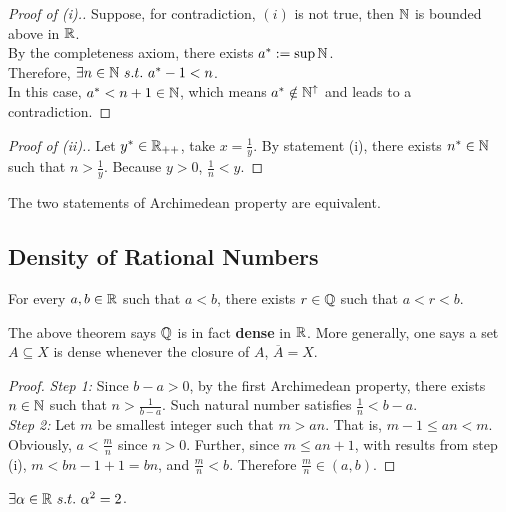 \documentclass[11pt]{article}
\begin{document}
	\begin{proof}[Proof of (i).]
		Suppose, for contradiction, $(i)$ is not true, then $\mathbb{N}$ is bounded above in $\mathbb{R}$. \\
		By the completeness axiom, there exists $a^* := \sup \mathbb{N}$.\\
		Therefore, $\exists n \in \mathbb{N}\ s.t.\ a^* - 1< n$.\\
		In this case, $a^* < n + 1 \in \mathbb{N}$, which means $a^* \notin \mathbb{N}^\uparrow$ and leads to a contradiction.
	\end{proof}
	
	\begin{proof}[Proof of (ii).]
		Let $y^* \in \mathbb{R}_{++}$, take $x = \frac{1}{y}$. By statement (i), there exists $n^* \in \mathbb{N}$ such that $n >	\frac{1}{y}$. Because $y > 0$, $\frac{1}{n} < y$.
	\end{proof}
	
	\begin{remark}
		The two statements of Archimedean property are equivalent.
	\end{remark}
	
	\subsection{Density of Rational Numbers}
	\begin{theorem}
		For every $a, b \in \mathbb{R}$ such that $a < b$, there exists $r \in \mathbb{Q}$ such that $a < r < b$.
	\end{theorem}
	
	\begin{remark}
		The above theorem says $\mathbb{Q}$ is in fact \textbf{dense} in $\mathbb{R}$. More generally, one says a set $A \subseteq X$ is dense whenever the closure of $A$, $\overline{A} = X$.
	\end{remark}
	
	\begin{proof}
		\emph{Step 1:} Since $b - a > 0$, by the first Archimedean property, there exists $n \in \mathbb{N}$ such that $n > \frac{1}{b - a}$. Such natural number satisfies $\frac{1}{n} < b - a$.\\
		\emph{Step 2:} Let $m$ be smallest integer such that $m > an$. That is, $m - 1 \leq an < m$. Obviously, $a < \frac{m}{n}$ since $n > 0$. Further, since $m \leq an + 1$, with results from step (i), $m < bn - 1 + 1 = bn$, and $\frac{m}{n} < b$. Therefore $\frac{m}{n} \in (a, b)$.
	\end{proof}
	
	\begin{theorem}
		$\exists \alpha \in \mathbb{R}\ s.t.\ \alpha^2 = 2$.
	\end{theorem}
	
\end{document}
